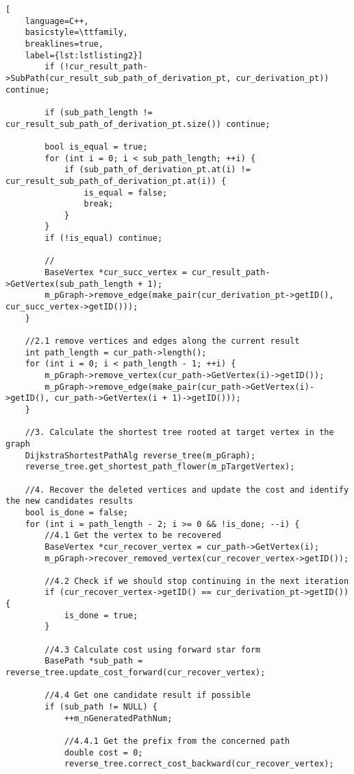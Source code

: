 \begin{lstlisting}[
    language=C++,
    basicstyle=\ttfamily,
    breaklines=true,
    label={lst:lstlisting2}]
        if (!cur_result_path->SubPath(cur_result_sub_path_of_derivation_pt, cur_derivation_pt)) continue;

        if (sub_path_length != cur_result_sub_path_of_derivation_pt.size()) continue;

        bool is_equal = true;
        for (int i = 0; i < sub_path_length; ++i) {
            if (sub_path_of_derivation_pt.at(i) != cur_result_sub_path_of_derivation_pt.at(i)) {
                is_equal = false;
                break;
            }
        }
        if (!is_equal) continue;

        //
        BaseVertex *cur_succ_vertex = cur_result_path->GetVertex(sub_path_length + 1);
        m_pGraph->remove_edge(make_pair(cur_derivation_pt->getID(), cur_succ_vertex->getID()));
    }

    //2.1 remove vertices and edges along the current result
    int path_length = cur_path->length();
    for (int i = 0; i < path_length - 1; ++i) {
        m_pGraph->remove_vertex(cur_path->GetVertex(i)->getID());
        m_pGraph->remove_edge(make_pair(cur_path->GetVertex(i)->getID(), cur_path->GetVertex(i + 1)->getID()));
    }

    //3. Calculate the shortest tree rooted at target vertex in the graph
    DijkstraShortestPathAlg reverse_tree(m_pGraph);
    reverse_tree.get_shortest_path_flower(m_pTargetVertex);

    //4. Recover the deleted vertices and update the cost and identify the new candidates results
    bool is_done = false;
    for (int i = path_length - 2; i >= 0 && !is_done; --i) {
        //4.1 Get the vertex to be recovered
        BaseVertex *cur_recover_vertex = cur_path->GetVertex(i);
        m_pGraph->recover_removed_vertex(cur_recover_vertex->getID());

        //4.2 Check if we should stop continuing in the next iteration
        if (cur_recover_vertex->getID() == cur_derivation_pt->getID()) {
            is_done = true;
        }

        //4.3 Calculate cost using forward star form
        BasePath *sub_path = reverse_tree.update_cost_forward(cur_recover_vertex);

        //4.4 Get one candidate result if possible
        if (sub_path != NULL) {
            ++m_nGeneratedPathNum;

            //4.4.1 Get the prefix from the concerned path
            double cost = 0;
            reverse_tree.correct_cost_backward(cur_recover_vertex);


\end{lstlisting}
